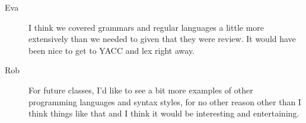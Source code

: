 \begin{description}
\item[Eva] I think we covered grammars and regular languages a little
  more extensively than we needed to given that they were review. It
  would have been nice to get to YACC and lex right away.

\item[Rob] For future classes, I'd like to see a bit more examples of
  other programming languages and syntax styles, for no other reason
  other than I think things like that and I think it would be
  interesting and entertaining.
\end{description}
